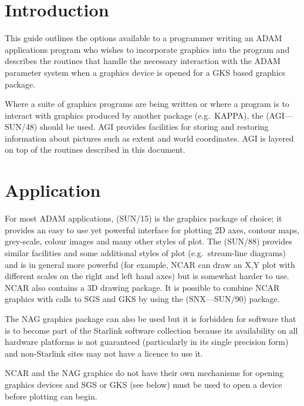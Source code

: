 \documentclass[twoside,11pt,nolof]{starlink}
\begin{document}
\scfrontmatter

\cleardoublepage


\section{Introduction}

This guide outlines the options available to a programmer writing an ADAM
applications program who wishes to incorporate graphics into the program and
describes the routines that handle the necessary interaction with the ADAM
parameter system when a graphics device is opened for a GKS based graphics
package.

Where a suite of graphics programs are being written or where a program is to
interact with graphics produced by another package (e.g.\ KAPPA), the
(AGI---SUN/48) should be used. AGI provides
facilities for storing and restoring information about pictures such as extent
and world coordinates. AGI is layered on top of the routines described in
this document.

\section{Application}

For most ADAM applications,
 (SUN/15) is the graphics package of choice;
it provides an easy to use yet powerful interface for plotting 2D axes, contour
maps, grey-scale, colour images and many other styles of plot. The
(SUN/88) provides similar facilities and some additional styles of plot
(e.g.\ stream-line diagrams) and is in general more powerful (for example, NCAR
can draw an X,Y plot with different scales on the right and left hand axes) but
is somewhat harder to use. NCAR also contains a 3D drawing package. It
is possible to combine NCAR graphics with calls to SGS and GKS by using
the  (SNX---SUN/90) package.

The NAG graphics package can also be used but it is forbidden for
software that is to become part of the Starlink software collection because
its availability on all hardware platforms is not guaranteed
(particularly in its single precision form) and non-Starlink sites may
not have a licence to use it.

NCAR and the NAG graphics do not have their own mechanisms for opening graphics
devices and SGS or GKS (see below) must be used to open a device before
plotting can begin.
\end{document}
